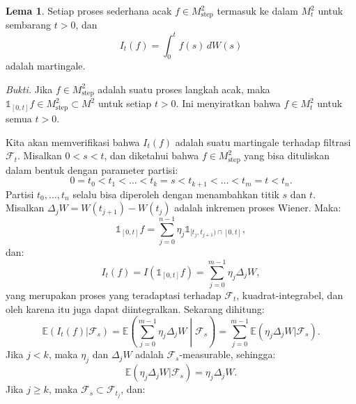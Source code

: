 \documentclass[aspectratio=169,11pt]{beamer}
\theoremstyle{definition}
\newtheorem{lema}{Lema}
\begin{document}
\begin{frame}[allowframebreaks]{\insertsection}{\insertsubsection}
  \begin{lema}
    Setiap proses sederhana acak $f \in M_{\text{step}}^2$ termasuk ke dalam $M_t^2$ untuk sembarang $t > 0$, dan
    \begin{equation*}
      I_t(f) = \int_0^t f(s) \, dW(s)
    \end{equation*}
    adalah martingale.
  \end{lema}
  \textit{Bukti.} Jika $f \in M_{\text{step}}^2$ adalah suatu proses langkah acak, maka $\mathds{1}_{[0,t]} f \in M_{\text{step}}^2 \subset M^2$ untuk setiap $t > 0$. Ini menyiratkan bahwa $f \in M_t^2$ untuk semua $t > 0$.

  Kita akan memverifikasi bahwa $I_t(f)$ adalah suatu martingale terhadap filtrasi $\mathcal{F}_t$. Misalkan $0 < s < t$, dan diketahui bahwa $f \in M_{\text{step}}^2$ yang bisa dituliskan dalam bentuk dengan parameter partisi:
  \begin{equation*}
    0 = t_0 < t_1 < \dots < t_k = s < t_{k+1} < \dots < t_m = t < t_n.
  \end{equation*}
  Partisi $t_0, \dots, t_n$ selalu bisa diperoleh dengan menambahkan titik $s$ dan $t$. Misalkan $\Delta_j W = W(t_{j+1}) - W(t_j)$ adalah inkremen proses Wiener. Maka:
  \begin{equation*}
    \mathds{1}_{[0,t]} f = \sum_{j=0}^{n-1} \eta_j \mathds{1}_{[t_j, t_{j+1}) \cap [0,t]},
  \end{equation*}
  dan:
  \begin{equation*}
    I_t(f) = I(\mathds{1}_{[0,t]} f) = \sum_{j=0}^{m-1} \eta_j \Delta_j W,
  \end{equation*}
  yang merupakan proses yang teradaptasi terhadap $\mathcal{F}_t$, kuadrat-integrabel, dan oleh karena itu juga dapat diintegralkan. Sekarang dihitung:
  \begin{equation*}
    \mathbb{E}(I_t(f) | \mathcal{F}_s) = \mathbb{E}\left( \sum_{j=0}^{m-1} \eta_j \Delta_j W \middle| \mathcal{F}_s \right) = \sum_{j=0}^{m-1} \mathbb{E}(\eta_j \Delta_j W | \mathcal{F}_s).
  \end{equation*}
  Jika $j < k$, maka $\eta_j$ dan $\Delta_j W$ adalah $\mathcal{F}_s$-measurable, sehingga:
  \begin{equation*}
    \mathbb{E}(\eta_j \Delta_j W | \mathcal{F}_s) = \eta_j \Delta_j W.
  \end{equation*}
  Jika $j \geq k$, maka $\mathcal{F}_s \subset \mathcal{F}_{t_j}$, dan:
  \begin{equation*}

\end{equation*}
\end{frame}
\end{document}
